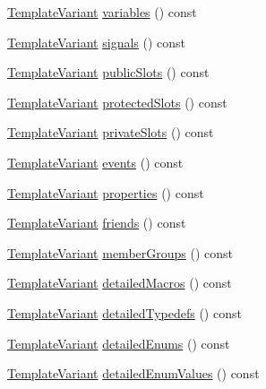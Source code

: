 \begin{DoxyCompactItemize}
\item 
\hyperlink{class_template_variant}{Template\+Variant} \hyperlink{class_module_context_1_1_private_a64cf9989a4f36a38aac1aa27564b7c18}{variables} () const 
\item 
\hyperlink{class_template_variant}{Template\+Variant} \hyperlink{class_module_context_1_1_private_a2ccbced16f2895e29db249ac5edc0404}{signals} () const 
\item 
\hyperlink{class_template_variant}{Template\+Variant} \hyperlink{class_module_context_1_1_private_affff2a106bf8a07cb72331679cf1a032}{public\+Slots} () const 
\item 
\hyperlink{class_template_variant}{Template\+Variant} \hyperlink{class_module_context_1_1_private_a6d4977e8c6e1327000c1be79f66acd2c}{protected\+Slots} () const 
\item 
\hyperlink{class_template_variant}{Template\+Variant} \hyperlink{class_module_context_1_1_private_a4c58d5d8b9965b7c241d3777120153eb}{private\+Slots} () const 
\item 
\hyperlink{class_template_variant}{Template\+Variant} \hyperlink{class_module_context_1_1_private_ab82a6caa07c7cfe05291e94a42fadd48}{events} () const 
\item 
\hyperlink{class_template_variant}{Template\+Variant} \hyperlink{class_module_context_1_1_private_a3a1a48662231382ddea9c07fa0c135ca}{properties} () const 
\item 
\hyperlink{class_template_variant}{Template\+Variant} \hyperlink{class_module_context_1_1_private_aa0dadaee5bd27eee33cb602f2bacec27}{friends} () const 
\item 
\hyperlink{class_template_variant}{Template\+Variant} \hyperlink{class_module_context_1_1_private_a52c1d84e95d2efb45568ad250c423107}{member\+Groups} () const 
\item 
\hyperlink{class_template_variant}{Template\+Variant} \hyperlink{class_module_context_1_1_private_af5ef8547f6cfc12838ec6deef4cfa60d}{detailed\+Macros} () const 
\item 
\hyperlink{class_template_variant}{Template\+Variant} \hyperlink{class_module_context_1_1_private_a5f6bddf774355d76af7e83f0a6bdaa4e}{detailed\+Typedefs} () const 
\item 
\hyperlink{class_template_variant}{Template\+Variant} \hyperlink{class_module_context_1_1_private_a33fe0d439e13adc70963e9783877ac23}{detailed\+Enums} () const 
\item 
\hyperlink{class_template_variant}{Template\+Variant} \hyperlink{class_module_context_1_1_private_af7e701570d6ce6e74b8e9b9e89480ff1}{detailed\+Enum\+Values} () const 

\end{DoxyCompactItemize}

